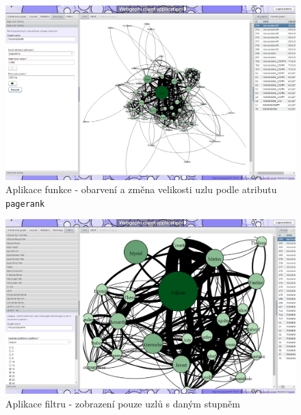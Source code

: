 \documentclass[thesis=M,czech]{FITthesis}[2014/05/6]
\begin{document}
\begin{figure}\centering
 	\includegraphics[width=1\textwidth]{images/prtsc/clientapp-06-ranking}
 	\caption[Aplikace funkce ]{Aplikace funkce  - obarvení a změna velikosti uzlu podle atributu \texttt{pagerank}}\label{fig:clientapp-06-ranking}
\end{figure}
\begin{figure}\centering
 	\includegraphics[width=1\textwidth]{images/prtsc/clientapp-07-filter}
 	\caption[Aplikace filtru]{Aplikace filtru - zobrazení pouze uzlů s daným stupněm}\label{fig:clientapp-07-filter}
\end{figure}
\end{document}
